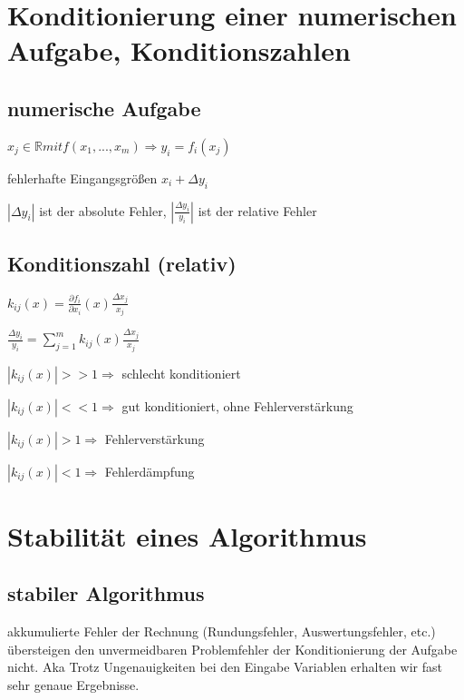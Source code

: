 \documentclass[12pt,a4paper]{article} %
\begin{document}
	\newpage
	
	\section{Konditionierung einer numerischen Aufgabe, Konditionszahlen}
	
	\subsection{numerische Aufgabe}
	
	$x_j \in \mathbb{R} mit f(x_1, ..., x_m) \Rightarrow y_i = f_i(x_j)$
	
	fehlerhafte Eingangsgrößen $x_i + \Delta y_i$
	
	$|\Delta y_i|$ ist der absolute Fehler, $|\frac{\Delta y_i}{y_i}|$ ist der relative Fehler
	
	\subsection{Konditionszahl (relativ)}
	
	$k_{ij}(x) = \frac{\partial f_i}{\partial x_i}(x) \frac{\Delta x_j}{x_j}$
	
	$\frac{\Delta y_i}{y_i} = \sum\limits_{j = 1}^{m}k_{ij}(x)\frac{\Delta x_j}{x_j}$
	
	$|k_{ij}(x)| >> 1 \Rightarrow$ schlecht konditioniert
	
	$|k_{ij}(x)| << 1 \Rightarrow$ gut konditioniert, ohne Fehlerverstärkung
	
	$|k_{ij}(x)| > 1 \Rightarrow$ Fehlerverstärkung
	
	$|k_{ij}(x)| < 1 \Rightarrow$ Fehlerdämpfung
	
	\newpage
	
	\section{Stabilität eines Algorithmus}
	
	\subsection{stabiler Algorithmus}
	
	akkumulierte Fehler der Rechnung (Rundungsfehler, Auswertungsfehler, etc.) übersteigen den unvermeidbaren Problemfehler der Konditionierung der Aufgabe nicht. Aka Trotz Ungenauigkeiten bei den Eingabe Variablen erhalten wir fast sehr genaue Ergebnisse.
	
	\newpage
	
\end{document}
